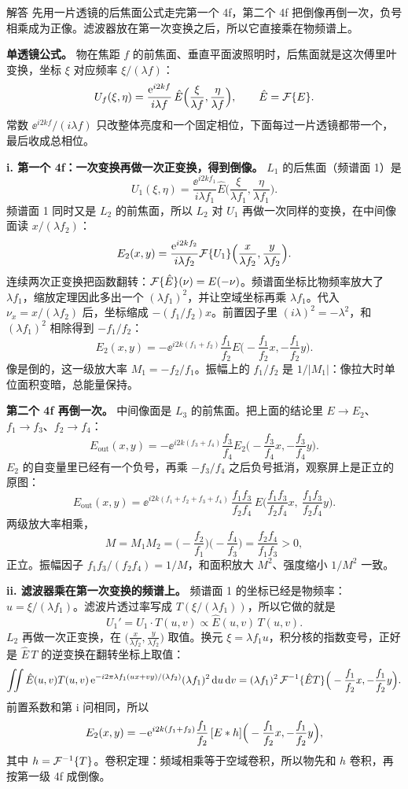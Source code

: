 \begin{exam}{解答}
先用一片透镜的后焦面公式走完第一个 4f，第二个 4f 把倒像再倒一次，负号相乘成为正像。滤波器放在第一次变换之后，所以它直接乘在物频谱上。

\textbf{单透镜公式。} 物在焦距 $f$ 的前焦面、垂直平面波照明时，后焦面就是这次傅里叶变换，坐标 $\xi$ 对应频率 $\xi/(\lambda f)$：
\[
U_f(\xi,\eta)=\frac{\mathrm{e}^{i2kf}}{i\lambda f}\,\hat E\Big(\frac{\xi}{\lambda f},\frac{\eta}{\lambda f}\Big),\qquad\hat E=\mathcal{F}\{E\}.
\]
常数 $\ee^{i2kf}/(i\lambda f)$ 只改整体亮度和一个固定相位，下面每过一片透镜都带一个，最后收成总相位。

\textbf{i. 第一个 4f：一次变换再做一次正变换，得到倒像。}
$L_1$ 的后焦面（频谱面 1）是
\[
U_1(\xi,\eta)=\frac{\ee^{i2kf_1}}{i\lambda f_1}\hat E\Big(\frac{\xi}{\lambda f_1},\frac{\eta}{\lambda f_1}\Big).
\]
频谱面 1 同时又是 $L_2$ 的前焦面，所以 $L_2$ 对 $U_1$ 再做一次同样的变换，在中间像面读 $x/(\lambda f_2)$：
\[
E_2(x,y)=\frac{\mathrm{e}^{i2kf_2}}{i\lambda f_2}\mathcal{F}\{U_1\}\Big(\frac{x}{\lambda f_2},\frac{y}{\lambda f_2}\Big).
\]
连续两次正变换把函数翻转：$\mathcal{F}\{\hat E\}(\nu)=E(-\nu)$。频谱面坐标比物频率放大了 $\lambda f_1$，缩放定理因此多出一个 $(\lambda f_1)^2$，并让空域坐标再乘 $\lambda f_1$。代入 $\nu_x=x/(\lambda f_2)$ 后，坐标缩成 $-(f_1/f_2)x$。前置因子里 $(i\lambda)^2=-\lambda^2$，和 $(\lambda f_1)^2$ 相除得到 $-f_1/f_2$：
\[
E_2(x,y)=-\ee^{i2k(f_1+f_2)}\frac{f_1}{f_2}E\Big(-\frac{f_1}{f_2}x,-\frac{f_1}{f_2}y\Big).
\]
像是倒的，这一级放大率 $M_1=-f_2/f_1$。振幅上的 $f_1/f_2$ 是 $1/|M_1|$：像拉大时单位面积变暗，总能量保持。

\textbf{第二个 4f 再倒一次。}
中间像面是 $L_3$ 的前焦面。把上面的结论里 $E\to E_2$、$f_1\to f_3$、$f_2\to f_4$：
\[
E_{\text{out}}(x,y)=-\ee^{i2k(f_3+f_4)}\frac{f_3}{f_4}E_2\Big(-\frac{f_3}{f_4}x,-\frac{f_3}{f_4}y\Big).
\]
$E_2$ 的自变量里已经有一个负号，再乘 $-f_3/f_4$ 之后负号抵消，观察屏上是正立的原图：
\[
E_{\text{out}}(x,y)
=\boxed{\ee^{i2k(f_1+f_2+f_3+f_4)}\,\frac{f_1f_3}{f_2f_4}\,E\Big(\frac{f_1f_3}{f_2f_4}x,\ \frac{f_1f_3}{f_2f_4}y\Big)} .
\]
两级放大率相乘，
\[
\boxed{M=M_1M_2=\Big(-\frac{f_2}{f_1}\Big)\Big(-\frac{f_4}{f_3}\Big)=\frac{f_2f_4}{f_1f_3}>0} ,
\]
正立。振幅因子 $f_1f_3/(f_2f_4)=1/M$，和面积放大 $M^2$、强度缩小 $1/M^2$ 一致。

\textbf{ii. 滤波器乘在第一次变换的频谱上。}
频谱面 1 的坐标已经是物频率：$u=\xi/(\lambda f_1)$。滤波片透过率写成 $T(\xi/(\lambda f_1))$，所以它做的就是
\[
U_1'=U_1\cdot T(u,v)\propto\hat E(u,v)\,T(u,v).
\]
$L_2$ 再做一次正变换，在 $\big(\frac{x}{\lambda f_2},\frac{y}{\lambda f_2}\big)$ 取值。换元 $\xi=\lambda f_1 u$，积分核的指数变号，正好是 $\hat E\,T$ 的逆变换在翻转坐标上取值：
\[
\iint\hat E(u,v)T(u,v)\,\mathrm{e}^{-i2\pi\lambda f_1(ux+vy)/(\lambda f_2)}(\lambda f_1)^2\,\mathrm{d} u\,\mathrm{d} v
=(\lambda f_1)^2\,\mathcal{F}^{-1}\{\hat ET\}\Big(-\frac{f_1}{f_2}x,-\frac{f_1}{f_2}y\Big).
\]
前置系数和第 i 问相同，所以
\[
E_2(x,y)=-\mathrm{e}^{i2k(f_1+f_2)}\frac{f_1}{f_2}\,[E\ast h]\Big(-\frac{f_1}{f_2}x,-\frac{f_1}{f_2}y\Big),
\]
其中 $h=\mathcal{F}^{-1}\{T\}$。卷积定理：频域相乘等于空域卷积，所以物先和 $h$ 卷积，再按第一级 4f 成倒像。


\end{exam}

